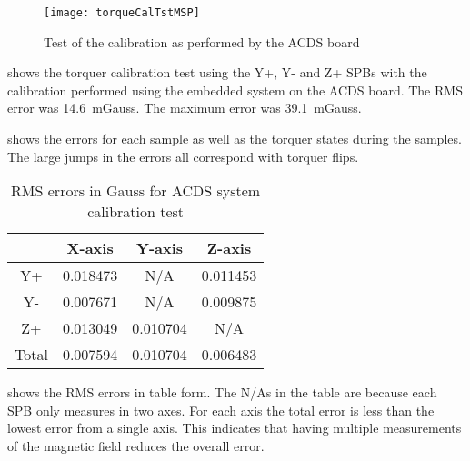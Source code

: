 \begin{figure}[!ht]
    \centering
    \texttt{[image: torqueCalTstMSP]}
    \caption{Test of the calibration as performed by the \ac{ACDS} board}
    \label{fig:tcalMSP}
\end{figure}

 shows the torquer calibration test using the Y+, Y- and Z+ \acp{SPB} with the calibration performed using the embedded system on the \ac{ACDS} board. The RMS error was 14.6~mGauss. The maximum error was 39.1~mGauss.


 shows the errors for each sample as well as the torquer states during the samples. The large jumps in the errors all correspond with torquer flips.

\begin{table}[!htb]
    \centering
    \caption{RMS errors in Gauss for \ac{ACDS} system calibration test}
    \label{tab:tcalMSPerr}
    \begin{tabular}{|c|c|c|c|}
        \hline
        &X-axis&Y-axis&Z-axis\\
        \hline
        Y+&0.018473&N/A&0.011453\\
        \hline
        Y-&0.007671&N/A&0.009875\\
        \hline
        Z+&0.013049&0.010704&N/A\\
        \hline
        Total&0.007594&0.010704&0.006483\\
        \hline
    \end{tabular}
\end{table}

 shows the RMS errors in table form. The N/As in the table are because each \ac{SPB} only measures in two axes. For each axis the total error is less than the lowest error from a single axis. This indicates that having multiple measurements of the magnetic field reduces the overall error.


